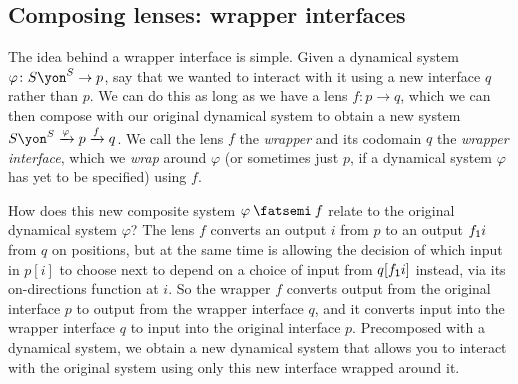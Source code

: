 \documentclass[Book-Poly]{subfiles}
\begin{document}
\subsection{Composing lenses: wrapper interfaces}\label{subsec.poly.dyn_sys.new.wrap}

The idea behind a wrapper interface is simple.
Given a dynamical system $\varphi\colon S\yon^S\to p$, say that we wanted to interact with it using a new interface $q$ rather than $p$.
We can do this as long as we have a lens $f\colon p\to q$, which we can then compose with our original dynamical system to obtain a new system $S\yon^S\To{\varphi}p\To{f}q$.
We call the lens $f$ the \emph{wrapper} and its codomain $q$ the \emph{wrapper interface}, which we \emph{wrap} around $\varphi$ (or sometimes just $p$, if a dynamical system $\varphi$ has yet to be specified) using $f$.

How does this new composite system $\varphi\then f$ relate to the original dynamical system $\varphi$?
The lens $f$ converts an output $i$ from $p$ to an output $f_{\textsf{1}}i$ from $q$ on positions, but at the same time is allowing the decision of which input in $p[i]$ to choose next to depend on a choice of input from $q[f_{\textsf{1}}i]$ instead, via its on-directions function at $i$.
So the wrapper $f$ converts output from the original interface $p$ to output from the wrapper interface $q$, and it converts input into the wrapper interface $q$ to input into the original interface $p$.
Precomposed with a dynamical system, we obtain a new dynamical system that allows you to interact with the original system using only this new interface wrapped around it.
\end{document}
